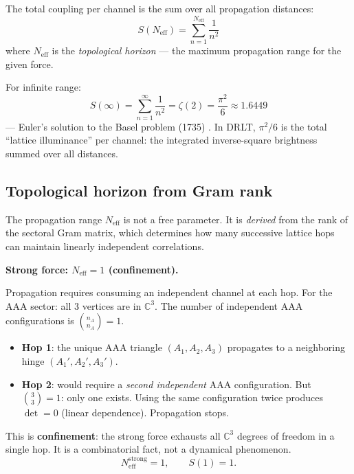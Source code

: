 \documentclass[12pt]{article}
\theoremstyle{remark}
\theoremstyle{definition}
\newcommand{\CC}{\mathbb{C}}
\begin{document}
The total coupling per channel is the sum over all propagation distances:
\begin{equation}
S(N_\text{eff}) = \sum_{n=1}^{N_\text{eff}} \frac{1}{n^2}
\label{eq:partial_Basel}
\end{equation}
where $N_\text{eff}$ is the \emph{topological horizon} --- the maximum propagation range for the given force.

For infinite range:
\begin{equation}
S(\infty) = \sum_{n=1}^{\infty} \frac{1}{n^2} = \zeta(2) = \frac{\pi^2}{6} \approx 1.6449
\end{equation}
--- Euler's solution to the Basel problem (1735) \cite{Euler}. In DRLT, $\pi^2/6$ is the total ``lattice illuminance'' per channel: the integrated inverse-square brightness summed over all distances.

\subsection{Topological horizon from Gram rank}
\label{sec:Neff}

The propagation range $N_\text{eff}$ is not a free parameter. It is \emph{derived} from the rank of the sectoral Gram matrix, which determines how many successive lattice hops can maintain linearly independent correlations.

\bigskip

\noindent\textbf{Strong force: $N_\text{eff} = 1$ (confinement).}

Propagation requires consuming an independent channel at each hop. For the AAA sector: all 3 vertices are in $\CC^3$. The number of independent AAA configurations is $\binom{n_A}{n_A} = 1$.

\begin{itemize}
\item \textbf{Hop 1}: the unique AAA triangle $(A_1, A_2, A_3)$ propagates to a neighboring hinge $(A_1', A_2', A_3')$.
\item \textbf{Hop 2}: would require a \emph{second independent} AAA configuration. But $\binom{3}{3} = 1$: only one exists. Using the same configuration twice produces $\det = 0$ (linear dependence). Propagation stops.
\end{itemize}

This is \textbf{confinement}: the strong force exhausts all $\CC^3$ degrees of freedom in a single hop. It is a combinatorial fact, not a dynamical phenomenon.
\begin{equation}
N_\text{eff}^\text{strong} = 1, \qquad S(1) = 1.
\end{equation}
\end{document}
